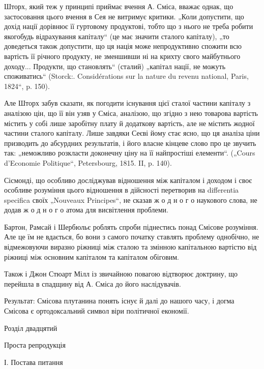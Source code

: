 Шторх, який теж у принципі приймає вчення А. Сміса, вважає однак,
що застосовання цього вчення в Сея не витримує критики. „Коли
допустити, що дохід нації дорівнює її гуртовому продуктові, тобто що з
нього не треба робити якогобудь відрахування капіталу“ (це має значити
сталого капіталу), „то доведеться також допустити, що ця нація може
непродуктивно спожити всю вартість її річного продукту, не зменшивши
ні на крихту свого майбутнього доходу... Продукти, що становлять“
(сталий) „капітал нації, не можуть споживатись“ (Storck:. Considérations
sur la nature du revenu national, Paris, 1824“, p. 150).

Але Шторх забув сказати, як погодити існування цієї сталої частини
капіталу з аналізою цін, що її він узяв у Сміса, аналізою, що згідно з
нею товарова вартість містить у собі лише заробітну плату й додаткову
вартість, але не містить жодної частини сталого капіталу. Лише завдяки
Сеєві йому стає ясно, що ця аналіза ціни призводить до абсурдних
результатів, і його власне кінцеве слово про це звучить так: „неможливо
розкласти доконечну ціну на її найпростіші елементи“. („Cours d’Economie
Politique“, Petersbourg, 1815. II, p. 140).

Сісмонді, що особливо досліджував відношення між капіталом і доходом
і своє особливе розуміння цього відношення в дійсності перетворив
на differentia specifica своїх „Nouveaux Principes“, не сказав ж о д н о г о
наукового слова, не додав ж о д н о г о атома для висвітлення проблеми.

Бартон, Рамсай і Шербюльє роблять спроби піднестись понад Смісове
розуміння. Але це їм не вдається, бо вони з самого початку ставлять
проблему однобічно, не відмежовуючи виразно ріжниці між сталою
та змінною капітальною вартістю від ріжниці між основним капіталом та
капіталом обіговим.

Також і Джон Стюарт Мілл із звичайною повагою відтворює доктрину,
що перейшла в спадщину від А. Сміса до його наслідувачів.

Результат: Смісова плутанина понять існує й далі до нашого часу, і
догма Смісова є ортодоксальний символ віри політичної економії.

Розділ двадцятий

Проста репродукція

І. Постава питання

